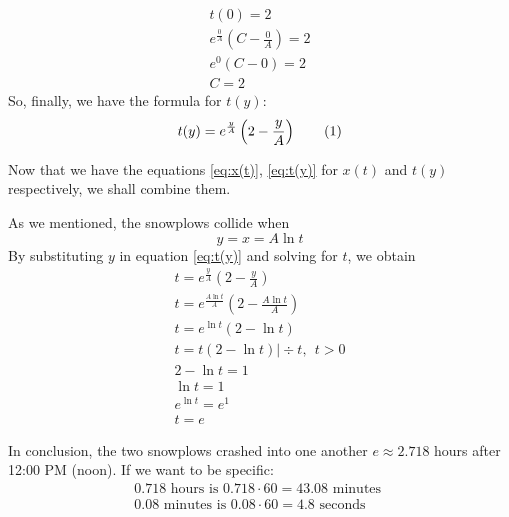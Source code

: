 \documentclass[a4paper,12pt]{article}
\renewcommand*{\textnormal}[1]{\text{ #1 }}
\newcommand\numberthis{\addtocounter{equation}{1}\tag{\theequation}}
\begin{document}
\begin{itemize}
            \begin{gather*}
                t(0) = 2 \\
                e^{\frac{0}{A}}\left(C - \frac{0}{A}\right) = 2 \\
                e^0 \left(C - 0\right) = 2 \\
                C = 2
            \end{gather*}
            So, finally, we have the formula for \(t(y)\):
            \begin{gather*}
                t(y) = e^\frac{y}{A}\left(2-\frac{y}{A}\right) \numberthis \label{eq:t(y)}
            \end{gather*}
        \end{itemize}

        Now that we have the equations \eqref{eq:x(t)}, \eqref{eq:t(y)} for \(x(t)\) and \(t(y)\) respectively, we shall combine them.

        \hfill \break
        As we mentioned, the snowplows collide when
        \begin{equation*}
            y = x = A \ln t
        \end{equation*}
        By substituting $y$ in equation \eqref{eq:t(y)} and solving for \(t\), we obtain
        \begin{gather*}
            t = e^\frac{y}{A}\left(2-\frac{y}{A}\right) \\
            t = e^\frac{A \ln t}{A}\left(2-\frac{A \ln t}{A}\right) \\
            t = e^{\ln t}\left(2 - \ln t\right) \\
            t = t (2-\ln t) \Bigg | \div t, \ \ t > 0 \\ 
            2-\ln t = 1 \\
            \ln t = 1 \\
            e^{\ln t} = e^1 \\
            \boxed{t = e}
        \end{gather*}

        In conclusion, the two snowplows crashed into one another \(e \approx 2.718\) hours after 12:00 PM (noon). If we want to be specific:
        \begin{gather*}
            0.718 \textnormal{hours is} 0.718 \cdot 60 = 43.08 \textnormal{minutes} \\
            0.08 \textnormal{minutes is} 0.08 \cdot 60 = 4.8 \textnormal{seconds}
        \end{gather*}
\end{document}
